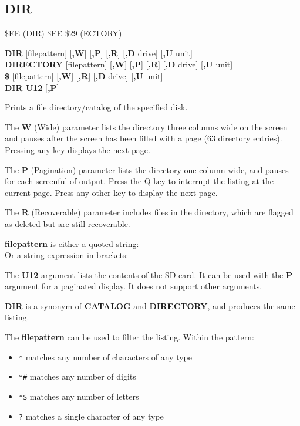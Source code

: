 
\newpage
\subsection{DIR}
\begin{description}[leftmargin=2cm,style=nextline]
\item [Token:] \$EE (DIR) \$FE \$29 (ECTORY)
\item [Format:] {\bf DIR} [filepattern] [{\bf,W}] [{\bf,P}] [{\bf,R}] [{\bf,D} drive] [{\bf,U} unit] \\
		{\bf DIRECTORY} [filepattern] [{\bf,W}] [{\bf,P}] [{\bf,R}] [{\bf,D} drive] [{\bf,U} unit] \\
		{\bf \$} [filepattern] [{\bf,W}] [{\bf,R}] [{\bf,D} drive] [{\bf,U} unit] \\
      {\bf DIR U12} [{\bf,P}]
\item [Usage:]  Prints a file directory/catalog of the specified disk.

   The {\bf W} (Wide) parameter lists the directory three columns wide
   on the screen and pauses after the screen has been filled with a page
   (63 directory entries). Pressing any key displays the next page.

   The {\bf P} (Pagination) parameter lists the directory one column wide,
   and pauses for each screenful of output. Press the Q key to
   interrupt the listing at the current page. Press any other key to display
   the next page.

   The {\bf R} (Recoverable) parameter includes files in the
   directory, which are flagged as deleted but are still
   recoverable.

   {\bf filepattern} is either a quoted string:  \\
   Or a string expression in brackets: 

   The {\bf U12} argument lists the contents of the SD card. It can be used with
   the {\bf P} argument for a paginated display. It does not support other arguments.

   \drivedefinition

   \unitdefinition

\item [Remarks:]
   {\bf DIR} is a synonym of {\bf CATALOG}
   and {\bf DIRECTORY}, and produces the same listing.

   The {\bf filepattern} can be used to filter the listing. Within the pattern:
   \begin{itemize}
      \item \texttt{*} matches any number of characters of any type
      \item \texttt{*\#} matches any number of digits
      \item \texttt{*\$} matches any number of letters
      \item \texttt{?} matches a single character of any type
   \end{itemize}


\end{description}
